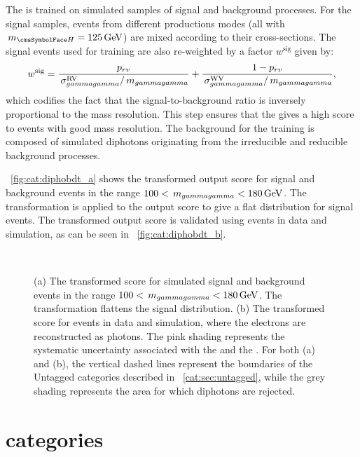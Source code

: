 The \DiPhoBdt is trained on simulated samples of signal and background processes. For the signal samples, events from different productions modes (all with $\mH=125\GeV$) are mixed according to their \SM cross-sections. The signal events used for training are also re-weighted by a factor $w^{\text{sig}}$ given by: 
\begin{equation}
w^{\text{sig}}= \frac{p_{rv}}{\,\sigma^\text{RV}_{gammagamma}/\,m_{gammagamma}}+\frac{1-p_{rv}}{\,\sigma^\text{WV}_{gammagamma}/\,m_{gammagamma}},
\end{equation} 
which codifies the fact that the signal-to-background ratio is inversely proportional to the mass resolution. This step ensures that the \DiPhoBdt gives a high score to events with good mass resolution.
The background for the training is composed of simulated diphotons originating from the irreducible and reducible \SM background processes. 

\Fig~\ref{fig:cat:diphobdt_a} shows the transformed \DiPhoBdt output score for signal and background events in the range $100 < \,m_{gammagamma} < 180\,\text{Ge\hspace{-.08em}V}$. The transformation is applied to the \DiPhoBdt output score to give a flat distribution for signal events. The transformed \DiPhoBdt output score is validated using \Zee events in data and simulation, as can be seen in \Fig~\ref{fig:cat:diphobdt_b}.
\begin{figure}[hpt]
\centering
\\
\caption{ (a) The transformed \DiPhoBdt score for simulated signal and background events in the range $100 < \,m_{gammagamma} < 180\,\text{Ge\hspace{-.08em}V}$. The transformation flattens the signal distribution. (b) The transformed \DiPhoBdt score for \Zee events in data and simulation, where the electrons are reconstructed as photons. The pink shading represents the systematic uncertainty associated with the \PhoIdBdt and the \PhoEnergyBdt. For both (a) and (b), the vertical dashed lines represent the boundaries of the Untagged categories described in \Sec~\ref{cat:sec:untagged}, while the grey shading represents the area for which diphotons are rejected.}
\label{fig:cat:diphobdt}
\end{figure}

\section{\VBFTag categories }
\label{cat:sec:vbftag}

